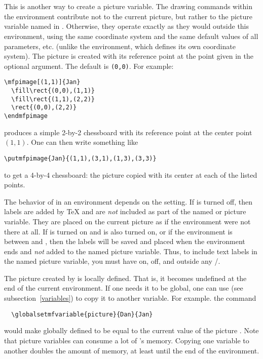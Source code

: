 \documentclass[letterpaper]{article}
\begin{document}
\begin{cd}
  \\
  \ \\
%
\end{cd}

This is another way to create a picture variable. The drawing commands
within the  environment contribute not to the current
\mfp{} picture, but rather to the picture variable named in .
Otherwise, they operate exactly as they would outside this environment,
using the same coordinate system and the same default values of all
parameters, etc. (unlike the  environment, which defines its
own coordinate system). The picture is created with its reference point
at the point  given in the optional argument. The default is
\texttt{(0,0)}. For example:
\begin{verbatim}
\mfpimage[(1,1)]{Jan}
  \fill\rect{(0,0),(1,1)}
  \fill\rect{(1,1),(2,2)}
  \rect{(0,0),(2,2)}
\endmfpimage
\end{verbatim}
produces a simple 2-by-2 chessboard with its reference point at the
center point $(1,1)$. One can then write something like
\begin{verbatim}
\putmfpimage{Jan}{(1,1),(3,1),(1,3),(3,3)}
\end{verbatim}
to get a 4-by-4 chessboard: the picture  copied with its
center at each of the listed points.

The behavior of  in an  environment depends on
the setting.  If  is turned off, then labels are added by
\TeX{} and are \emph{not} included as part of the named \MF{} or \MP{}
picture variable. They are placed on the current picture as if the
 environment were not there at all. If  is
turned on and  is also turned on, or if the
 environment is between  and
, then the labels will be saved and placed when the
 environment ends and \emph{not} added to the named picture
variable. Thus, to include text labels in the named picture variable,
you must have  on,  off, and
 outside any \slash{}.

The picture created by  is locally defined. That is, it
becomes undefined at the end of the current  environment. If
one needs it to be global, one can use  (see
subsection~\ref{variables}) to copy it to another variable. For example.
the command
\begin{verbatim}
  \globalsetmfvariable{picture}{Dan}{Jan}
\end{verbatim}
would make  globally defined to be equal to the current value
of the picture . Note that picture variables can consume a lot
of \MF{}'s memory. Copying one variable to another doubles the amount of
memory, at least until the end of the  environment.
\end{document}
